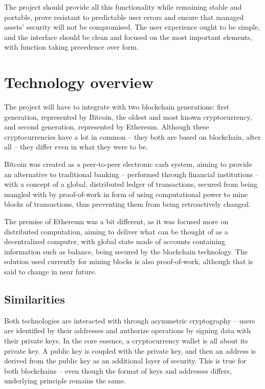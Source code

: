 The project should provide all this functionality
while remaining stable and portable,
prove resistant to predictable user errors
and ensure that managed assets' security will not be compromised.
The user experience ought to be simple,
and the interface should be clean and focused on the most important elements,
with function taking precedence over form.

\section{Technology overview}

The project will have to integrate with two blockchain generations:
first generation, represented by Bitcoin, the oldest and most known
cryptocurrency, and second generation, represented by Ethereum.
Although these cryptocurrencies have a lot in common
-- they both are based on blockchain, after all
-- they differ even in what they were to be.

Bitcoin was created as a peer-to-peer electronic cash system,
aiming to provide an alternative to traditional banking
-- performed through financial institutions
-- with a concept of a global,
distributed ledger of transactions,
secured from being mangled with by proof-of-work
in form of using computational power to mine blocks of transactions,
thus preventing them from being retroactively changed.

The premise of Ethereum was a bit different,
as it was focused more on distributed computation,
aiming to deliver what can be thought of as a decentralized computer,
with global state made of accounts containing information such as balance,
being secured by the blockchain technology.
The solution used currently for mining blocks is also proof-of-work,
although that is said to change in near future.

\subsection{Similarities}

Both technologies are interacted with through asymmetric cryptography
-- users are identified by their addresses and authorize operations
by signing data with their private keys.
In the core essence, a cryptocurrency wallet is all about its private key.
A public key is coupled with the private key,
and then an address is derived from the public key
as an additional layer of security.
This is true for both blockchains
-- even though the format of keys and addresses differs,
underlying principle remains the same.

